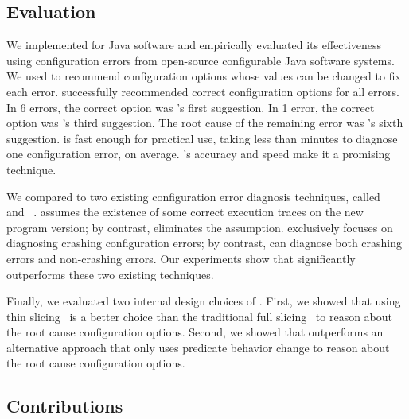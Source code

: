 \subsection{Evaluation}

We implemented \ourtool for Java software and empirically evaluated
its effectiveness using \errornum configuration errors
from \subjnum open-source configurable Java software systems. 
We used \ourtool to recommend configuration options whose values
can be changed to fix each error.
\ourtool successfully recommended correct configuration options
for all \errornum errors. In 6 errors, the correct option was \ourtool's first
suggestion. In 1 error, the correct option was
\ourtool's third suggestion. The root cause of the remaining
error was \ourtool's sixth suggestion. \ourtool is fast enough for practical use,
taking less than \avgtime minutes to diagnose one configuration error, on average.
\ourtool's accuracy and speed make it a promising technique.


We compared \ourtool to two existing configuration error diagnosis
techniques, called \prevtool~\cite{Zhang:2013:ADS}
and \conftool~\cite{Rabkin:2011:PPC}.
\prevtool assumes the existence of some correct execution traces
on the new program version; by contrast, \ourtool eliminates the
assumption.
\conftool exclusively focuses on diagnosing crashing configuration errors;
by contrast, \ourtool can diagnose both crashing errors and
non-crashing errors.
Our experiments
show that \ourtool significantly outperforms these two existing techniques.

Finally, we evaluated two internal design choices of \ourtool. First, we 
showed that using thin slicing~\cite{Sridharan:2007} is a better choice than
the traditional full slicing~\cite{Horwitz:1988} to reason about the
root cause configuration options. Second, we showed that 
\ourtool outperforms an alternative approach
that only uses predicate behavior change to reason about
the root cause configuration options.




\subsection{Contributions}

